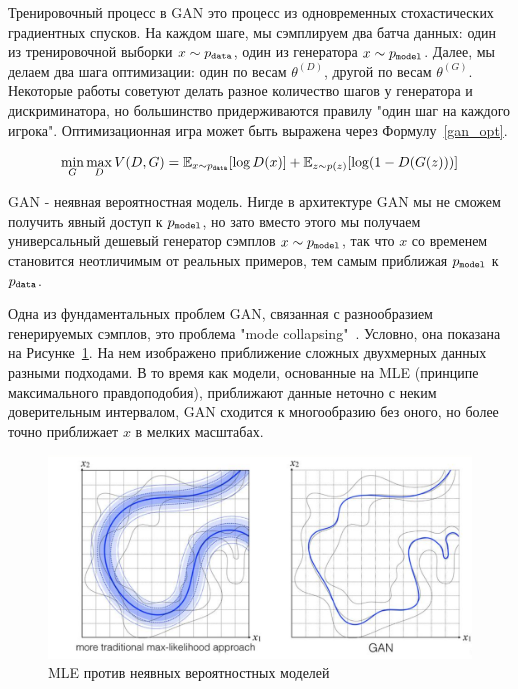 \documentclass{spbau-diploma}
\begin{document}
Тренировочный процесс в GAN это процесс из одновременных стохастических 
градиентных спусков. На каждом шаге, мы сэмплируем два батча данных: один из
тренировочной выборки $x \sim p_{\texttt{data}}$, один из генератора $x \sim p_{\texttt{model}}$. 
Далее, мы делаем два шага оптимизации: один по весам $\theta^{(D)}$, другой 
по весам $\theta^{(G)}$. Некоторые работы советуют делать разное количество 
шагов у генератора и дискриминатора, но большинство придерживаются правилу "один
шаг на каждого игрока". Оптимизационная игра может быть выражена через 
Формулу~\ref{gan_opt}.

\begin{equation}
\label{gan_opt}
\min_G \max_D V(D, G) = \mathbb{E}_{x \sim p_{\texttt{data}}}{[\log{D(x)}]}
+ \mathbb{E}_{z \sim p(z)}{[\log(1 - D(G(z)))]}
\end{equation}

GAN - неявная вероятностная модель. Нигде в архитектуре GAN мы не сможем 
получить явный доступ к $p_{\texttt{model}}$, но зато вместо этого мы получаем 
универсальный дешевый генератор сэмплов $x \sim p_{\texttt{model}}$, так что $x$ со 
временем становится неотличимым от реальных примеров, тем самым приближая 
$p_{\texttt{model}}$ к $p_{\texttt{data}}$.

Одна из фундаментальных проблем GAN, связанная с разнообразием генерируемых 
сэмплов, это проблема "mode collapsing"~\cite{mode_collapsing}.
Условно, она показана на Рисунке~\ref{ml_vs_gan}.
На нем изображено 
приближение сложных двухмерных данных разными подходами. В то время как модели, 
основанные на MLE (принципе максимального правдоподобия),
приближают данные неточно с неким доверительным интервалом, GAN сходится к
многообразию без оного, но более точно приближает $x$ в мелких 
масштабах.

\begin{figure}[H]
\centering
\includegraphics[width=\textwidth]{images/ml_vs_gan.png}
\caption{MLE против неявных вероятностных моделей~\cite{vetrovgan}}
\label{ml_vs_gan}
\end{figure}
\end{document}
